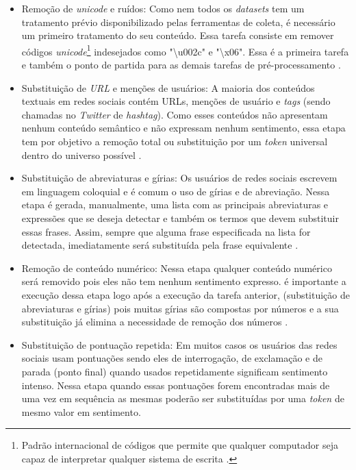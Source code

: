 \begin{itemize}
\item Remoção de \textit{unicode} e ruídos: Como nem todos os \textit{datasets} tem um tratamento prévio disponibilizado pelas ferramentas de coleta, é necessário um primeiro tratamento do seu conteúdo. Essa tarefa consiste em remover códigos \textit{unicode}\footnote{ Padrão internacional de códigos que permite que qualquer computador seja capaz de interpretar qualquer sistema de escrita \cite{0321480910}.} indesejados   como "\textbackslash u002c" e "\textbackslash x06". Essa é a primeira tarefa e também o ponto de partida para as demais tarefas de pré-processamento \cite{SYMEONIDIS2018298}.

\item Substituição de \textit{URL} e menções de usuários: A maioria dos conteúdos textuais em redes sociais contém URLs, menções de usuário e \textit{tags} (sendo chamadas no \textit{Twitter} de \textit{hashtag}). Como esses conteúdos não apresentam nenhum conteúdo semântico e não expressam nenhum sentimento, essa etapa tem por objetivo a remoção total ou substituição por um \textit{token} universal dentro do universo possível \cite{Khan2014}.
\label{it:giria}

\item Substituição de abreviaturas e gírias: Os usuários de redes sociais escrevem em linguagem coloquial e é comum o uso de gírias e de abreviação. Nessa etapa é gerada, manualmente, uma lista com as principais abreviaturas e expressões que se deseja detectar e também os termos que devem substituir essas frases. Assim, sempre que alguma frase especificada na lista for detectada, imediatamente será substituída pela frase equivalente \cite{Kouloumpis}.

\item Remoção de conteúdo numérico: Nessa etapa qualquer conteúdo numérico será removido pois eles não tem nenhum sentimento expresso. é importante a execução dessa etapa logo após a execução da tarefa anterior, (substituição de abreviaturas e gírias) pois muitas gírias são compostas por números e a sua substituição já elimina a necessidade de remoção dos números \cite{He:2011:AEP:2002472.2002489}.

\item Substituição de pontuação repetida: Em muitos casos os usuários das redes sociais usam pontuações sendo eles de interrogação, de exclamação e de parada (ponto final) quando usados repetidamente significam sentimento intenso. Nessa etapa quando essas pontuações forem encontradas mais de uma vez em sequência as mesmas poderão ser substituídas por uma \textit{token} de mesmo valor em sentimento.


\end{itemize}
